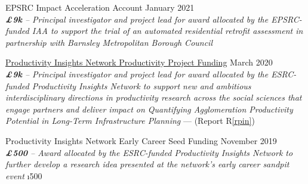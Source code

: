 \documentclass[10pt]{article}
\newcommand{\blankline}{\quad\pagebreak[3]}
\begin{document}
\blankline

EPSRC Impact Acceleration Account \hfill {January 2021}\\
\emph{\textbf{\pounds9k} -- Principal investigator and project lead for award allocated by the EPSRC-funded IAA to support the trial of an automated residential retrofit assessment in partnership with Barnsley Metropolitan Borough Council}
\FPset{}
\FPset{}

\blankline

\href{https://productivityinsightsnetwork.co.uk/projects/}{Productivity Insights Network Productivity Project Funding} \hfill {March 2020}\\
\emph{\textbf{\pounds9k} -- Principal investigator and project lead for award allocated by the ESRC-funded Productivity Insights Network to support new and ambitious interdisciplinary directions in productivity research across the social sciences that engage partners and deliver impact on Quantifying Agglomeration Productivity Potential in Long-Term Infrastructure Planning} --- (Report R\ref{rpin})
\FPset{}
\FPset{}

\blankline

Productivity Insights Network Early Career Seed Funding \hfill {November 2019}\\
\emph{\textbf{\pounds500} -- Award allocated by the ESRC-funded Productivity Insights Network to further develop a research idea presented at the network's early career sandpit event}
\FPset\i{500}
\FPset{}


%

\end{document}
